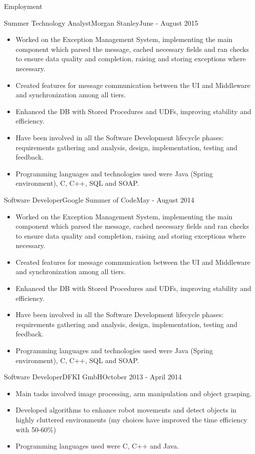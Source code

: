 \documentclass[]{cv}
\begin{document}
\begin{cvsection}{Employment}
		\begin{cvsubsection}{Summer Technology Analyst}{Morgan Stanley}{June - August 2015}
			\begin{itemize}
				\item Worked on the Exception Management System, implementing the main component which parsed the message, cached necessary fields and ran checks to ensure 
					data quality and completion, raising and storing exceptions where necessary.
				\item Created features for message communication between the UI and Middleware and synchronization among all tiers.	
				\item Enhanced the DB with Stored Procedures and UDFs, improving stability and efficiency.
				\item Have been involved in all the Software Development lifecycle phases: requirements gathering and analysis, design,
					implementation, testing and feedback.
				\item Programming languages and technologies used were Java (Spring environment), C, C++, SQL and SOAP.
			\end{itemize}
		\end{cvsubsection}

		\begin{cvsubsection}{Software Developer}{Google Summer of Code}{May - August 2014}
			\begin{itemize}
				\item Worked on the Exception Management System, implementing the main component which parsed the message, cached necessary fields and ran checks to ensure 
					data quality and completion, raising and storing exceptions where necessary.
				\item Created features for message communication between the UI and Middleware and synchronization among all tiers.	
				\item Enhanced the DB with Stored Procedures and UDFs, improving stability and efficiency.
				\item Have been involved in all the Software Development lifecycle phases: requirements gathering and analysis, design,
					implementation, testing and feedback.
				\item Programming languages and technologies used were Java (Spring environment), C, C++, SQL and SOAP.
			\end{itemize}
		\end{cvsubsection}

		\begin{cvsubsection}{Software Developer}{DFKI GmbH}{October 2013 - April 2014}
			\begin{itemize}
				\item Main tasks involved image processing, arm manipulation and object grasping.
				\item Developed algorithms to enhance robot movements and detect objects in highly cluttered environments (my
				choices have improved the time efficiency with 50-60\%)
				\item Programming languages used were C, C++ and Java.
			\end{itemize}
		\end{cvsubsection}


\end{cvsection}
\end{document}
